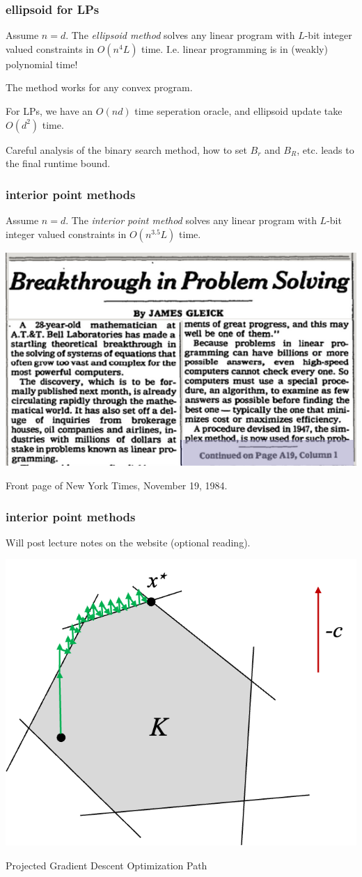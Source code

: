 \documentclass[compress]{beamer}
\begin{document}
\begin{frame}[t]
	\frametitle{ellipsoid for LPs}
	\begin{theorem}[Khachiyan, 1979]
		Assume $n=d$. The \emph{ellipsoid method} solves any linear program with $L$-bit integer valued constraints in $O(n^4L)$ time. I.e. linear programming is in (weakly) polynomial time!
	\end{theorem}
The method works for any convex program. 

For LPs, we have an $O(nd)$ time seperation oracle, and ellipsoid update take $O(d^2)$ time.

 Careful analysis of the binary search method, how to set $B_r$ and $B_R$, etc. leads to the final runtime bound. 
\end{frame}

\begin{frame}[t]
	\frametitle{interior point methods}
	\begin{theorem}[Karmarkar, 1984]
		Assume $n=d$. The \emph{interior point method} solves any linear program with $L$-bit integer valued constraints in $O(n^{3.5}L)$ time. 
	\end{theorem}
	\begin{center}
	\includegraphics[width=.7\textwidth]{interiornews.png}
	
			Front page of New York Times, November 19, 1984.
	\end{center}
\end{frame}

\begin{frame}[t]
	\frametitle{interior point methods}
	Will post lecture notes on the website (optional reading).
	\begin{center}
			\includegraphics[width=.6\textwidth]{projected_gradient.png}
			
			Projected Gradient Descent Optimization Path
	\end{center}

\end{frame}
\end{document}
